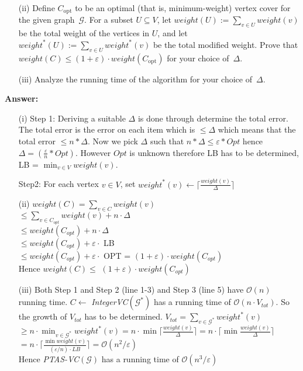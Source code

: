 \documentclass{article}
\newcommand{\G}{\ensuremath{\mathcal{G}}}
\newcommand{\graph}{\G}
\newcommand{\eps}{\varepsilon}
\renewcommand{\leq}{\leqslant}
\renewcommand{\geq}{\geqslant}
\newcommand{\weight}{\mathit{weight}}
\newcommand{\optsub}{\mathrm{opt}}
\newcounter{rcounter}
\newenvironment{rlist}%
{\begin{list}{\setnr-\arabic{rcounter}}{\usecounter{rcounter}}}{\end{list}}
\begin{document}
\begin{rlist}
\begin{enumerate}
            \item[(ii)] Define $C_{\optsub}$ to be an optimal (that is, minimum-weight) vertex cover for the given graph~$\graph$.
            For a subset $U\subseteq V$, let $\weight(U):=\sum_{v\in U}\weight(v)$
            be the total weight of the vertices in $U$, and let
            $\weight^*(U):=\sum_{v\in U}\weight^*(v)$ be the total modified weight.
            Prove that $\weight(C) \leq (1+\eps)\cdot \weight(C_{\optsub})$ for your choice of~$\Delta$.
            
            \item[(iii)] Analyze the running time of the algorithm for your choice of~$\Delta$.
        \end{enumerate}
        
        \textbf{Answer:}
        \begin{enumerate}
            \item[(i)]
            Step 1: Deriving a suitable $\Delta$ is done through determine the total error. The total error is the error on each item which is $\leq \Delta$ which means that the total error $\leq n * \Delta$. Now we pick $\Delta$ such that $n * \Delta \leq \varepsilon * Opt$ hence $\Delta = (\frac{\varepsilon}{n}*Opt)$. However $Opt$ is unknown therefore LB has to be determined, LB = $\min_{v\in V} \weight(v)$.
            
            Step2: For each vertex $v\in V$, set $\weight^*(v) \gets \lceil \frac{\weight(v)}{\Delta} \rceil$
            \item[(ii)]
            $\weight(C) = \sum_{v\in C} \weight(v)$
            \\$\leq \sum_{v\in C_{opt}} \weight(v) + n \cdot \Delta$
            \\$\leq \weight(C_{opt}) + n \cdot \Delta$
            \\$\leq \weight(C_{opt}) + \eps \cdot $ LB 
            \\$\leq \weight(C_{opt}) + \eps \cdot $ OPT = $(1+ \eps) \cdot \weight(C_{opt})$
            \\Hence $\weight(C) \leq$ $(1+ \eps) \cdot \weight(C_{opt})$
            
            \item[(iii)]
            Both Step 1 and Step 2 (line 1-3) and Step 3 (line 5) have $\mathcal{O}(n)$ running time. $C  \gets$ \emph{IntegerVC}$(\graph^*)$ has a running time of $\mathcal{O}(n\cdot V_{tot})$. So the growth of $V_{tot}$ has to be determined.
            $V_{tot} = \sum_{v\in \graph^*} \weight^*(v)$ 
            \\$\geq n \cdot \min_{v\in \graph^*} \weight^*(v)= n \cdot \min \lceil \frac{\weight(v)}{\Delta} \rceil = n \cdot  \lceil \min \frac{\weight(v)}{\Delta} \rceil $
            \\$ = n \cdot  \lceil  \frac{\min\weight(v)}{(\eps / n) \cdot LB} \rceil = \mathcal{O}(n^2 / \eps)$
            \\Hence \emph{PTAS-VC}$(\graph)$ has a running time of $\mathcal{O}(n^3 / \eps)$
            

\end{enumerate}
\end{rlist}
\end{document}
